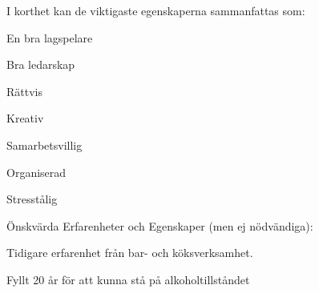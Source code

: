 \documentclass[10pt]{article}
\begin{document}
I korthet kan de viktigaste egenskaperna sammanfattas som:
\begin{dashlist}
    \item En bra lagspelare
    \item Bra ledarskap
    \item Rättvis
    \item Kreativ
    \item Samarbetsvillig
    \item Organiserad
    \item Stresstålig    
\end{dashlist}

Önskvärda Erfarenheter och Egenskaper (men ej nödvändiga):
\begin{dashlist}
    \item Tidigare erfarenhet från bar- och köksverksamhet.
    \item Fyllt 20 år för att kunna stå på alkoholtillståndet        
\end{dashlist}
\end{document}
